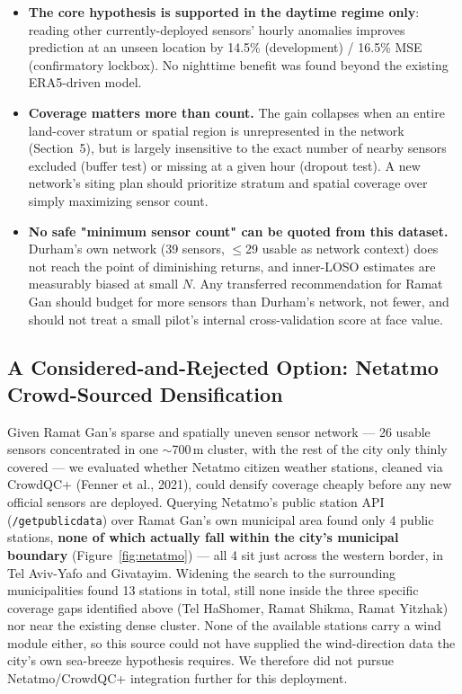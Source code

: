 \documentclass[11pt]{article}
\begin{document}
\begin{itemize}
  \item \textbf{The core hypothesis is supported in the daytime regime
  only}: reading other currently-deployed sensors' hourly anomalies
  improves prediction at an unseen location by 14.5\% (development) /
  16.5\% MSE (confirmatory lockbox). No nighttime benefit was found beyond
  the existing ERA5-driven model.
  \item \textbf{Coverage matters more than count.} The gain collapses when
  an entire land-cover stratum or spatial region is unrepresented in the
  network (Section~5), but is largely insensitive to the exact number of
  nearby sensors excluded (buffer test) or missing at a given hour
  (dropout test). A new network's siting plan should prioritize stratum
  and spatial coverage over simply maximizing sensor count.
  \item \textbf{No safe "minimum sensor count" can be quoted from this
  dataset.} Durham's own network (39 sensors, $\leq$29 usable as network
  context) does not reach the point of diminishing returns, and inner-LOSO
  estimates are measurably biased at small $N$. Any transferred
  recommendation for Ramat Gan should budget for more sensors than Durham's
  network, not fewer, and should not treat a small pilot's internal
  cross-validation score at face value.
\end{itemize}

\subsection*{A Considered-and-Rejected Option: Netatmo Crowd-Sourced
Densification}

Given Ramat Gan's sparse and spatially uneven sensor network --- 26 usable
sensors concentrated in one $\sim$700\,m cluster, with the rest of the city
only thinly covered --- we evaluated whether Netatmo citizen weather
stations, cleaned via CrowdQC+ (Fenner et al., 2021), could densify
coverage cheaply before any new official sensors are deployed. Querying
Netatmo's public station API (\texttt{/getpublicdata}) over Ramat Gan's
own municipal area found only 4 public stations, \textbf{none of which
actually fall within the city's municipal boundary} (Figure~\ref{fig:netatmo}) ---
all 4 sit just across the western border, in Tel Aviv-Yafo and Givatayim.
Widening the search to the surrounding municipalities found 13 stations in
total, still none inside the three specific coverage gaps identified above
(Tel HaShomer, Ramat Shikma, Ramat Yitzhak) nor near the existing dense
cluster. None of the available stations carry a wind module either, so
this source could not have supplied the wind-direction data the city's own
sea-breeze hypothesis requires. We therefore did not pursue
Netatmo/CrowdQC+ integration further for this deployment.
\end{document}
